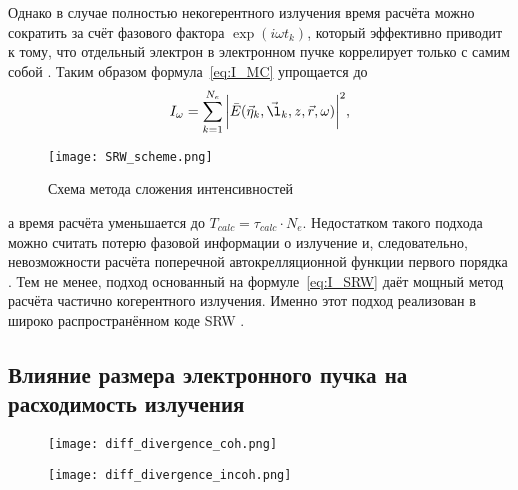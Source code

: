 Однако в случае полностью некогерентного излучения время расчёта можно сократить за счёт фазового фактора $\exp{(i \omega t_k)}$, который эффективно приводит к тому, что отдельный электрон в электронном пучке коррелирует только с самим собой \cite{geloni_transverse_2008}. Таким образом формула~\ref{eq:I_MC} упрощается до 
\begin{align}
 	I_{\omega} = \sum\limits_{k=1}^{N_e} \bigg|\bar{E}(\vec{\eta}_k, \vec{\l}_k, z, \vec{r}, \omega)\bigg|^2,
 	\label{eq:I_SRW} 
\end{align}
\begin{figure}[H] 
	\centering 	\texttt{[image: SRW\_scheme.png]}
	\caption{Схема метода сложения интенсивностей}
	\label{fig:SRW_scheme}
\end{figure}
\noindent а время расчёта уменьшается до $T_{calc} = \tau_{calc} \cdot N_e$. Недостатком такого подхода можно считать потерю фазовой информации о излучение и, следовательно, невозможности расчёта поперечной автокрелляционной функции первого порядка . Тем не менее, подход основанный на формуле~\ref{eq:I_SRW} даёт мощный метод расчёта частично когерентного излучения. Именно этот подход реализован в широко распространённом коде SRW .
 
\subsection{Влияние размера электронного пучка на расходимость излучения}

\begin{figure}[H] 
	\centering 	\texttt{[image: diff\_divergence\_coh.png]}
	\caption{}
	\label{fig:diff_coh_incoh_rad}
\end{figure}

\begin{figure}[H] 
	\centering 	\texttt{[image: diff\_divergence\_incoh.png]}
	\caption{}
	\label{fig:diff_coh_incoh_rad}
\end{figure}

